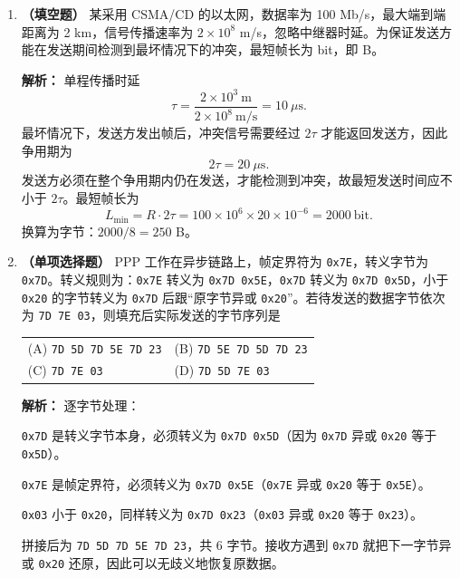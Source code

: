 \begin{enumerate}
一种编码的最小海明距离为 $d$ 时，可检出至多 $d-1$ 位错误；若用于纠错，则最多纠正 $\lfloor (d-1)/2\rfloor$ 位错误，故 (C) 对。

以太网收到 CRC 错误的帧直接丢弃，不进行链路层确认和重传，可靠传输由上层（如 TCP）负责，故 (D) 错。\else \answerarea \fi

\item \textbf{（填空题）} 某采用 CSMA/CD 的以太网，数据率为 100 Mb/s，最大端到端距离为 2 km，信号传播速率为 $2\times10^{8}$ m/s，忽略中继器时延。为保证发送方能在发送期间检测到最坏情况下的冲突，最短帧长为 \underline{\hspace{2.5cm}} bit，即 \underline{\hspace{2cm}} B。

\ifshowsolutions\par\noindent\textbf{解析：} 单程传播时延
\[
\tau=\frac{2\times10^{3}\ \text{m}}{2\times10^{8}\ \text{m/s}}=10\ \mu\text{s}.
\]
最坏情况下，发送方发出帧后，冲突信号需要经过 $2\tau$ 才能返回发送方，因此争用期为
\[
2\tau=20\ \mu\text{s}.
\]
发送方必须在整个争用期内仍在发送，才能检测到冲突，故最短发送时间应不小于 $2\tau$。最短帧长为
\[
L_{\min}=R\cdot 2\tau=100\times10^{6}\times20\times10^{-6}=2000\ \text{bit}.
\]
换算为字节：$2000/8=250$ B。\else \answerarea \fi

\item \textbf{（单项选择题）} PPP 工作在异步链路上，帧定界符为 \texttt{0x7E}，转义字节为 \texttt{0x7D}。转义规则为：\texttt{0x7E} 转义为 \texttt{0x7D 0x5E}，\texttt{0x7D} 转义为 \texttt{0x7D 0x5D}，小于 \texttt{0x20} 的字节转义为 \texttt{0x7D} 后跟“原字节异或 \texttt{0x20}”。若待发送的数据字节依次为 \texttt{7D 7E 03}，则填充后实际发送的字节序列是
\begin{center}
\begin{tabular}{ll}
(A) \texttt{7D 5D 7D 5E 7D 23} & (B) \texttt{7D 5E 7D 5D 7D 23} \\[4pt]
(C) \texttt{7D 7E 03} & (D) \texttt{7D 5D 7E 03}
\end{tabular}
\end{center}

\ifshowsolutions\par\noindent\textbf{解析：} 逐字节处理：

\texttt{0x7D} 是转义字节本身，必须转义为 \texttt{0x7D 0x5D}（因为 \texttt{0x7D} 异或 \texttt{0x20} 等于 \texttt{0x5D}）。

\texttt{0x7E} 是帧定界符，必须转义为 \texttt{0x7D 0x5E}（\texttt{0x7E} 异或 \texttt{0x20} 等于 \texttt{0x5E}）。

\texttt{0x03} 小于 \texttt{0x20}，同样转义为 \texttt{0x7D 0x23}（\texttt{0x03} 异或 \texttt{0x20} 等于 \texttt{0x23}）。

拼接后为 \texttt{7D 5D 7D 5E 7D 23}，共 6 字节。接收方遇到 \texttt{0x7D} 就把下一字节异或 \texttt{0x20} 还原，因此可以无歧义地恢复原数据。\else \answerarea \fi

\end{enumerate}

